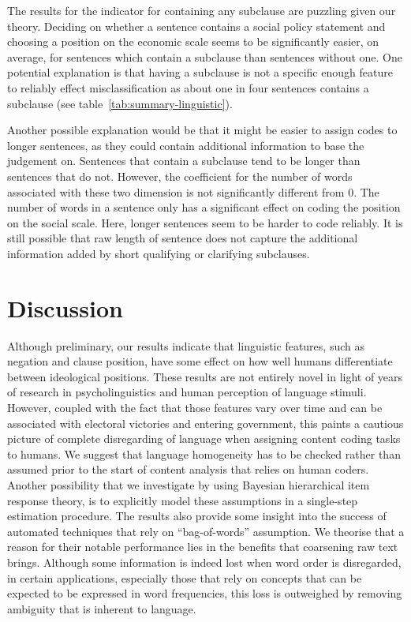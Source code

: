 \documentclass[a4paper, 12pt]{article}
\begin{document}
The results for the indicator for containing any subclause are puzzling given our theory. Deciding on whether a sentence contains a social policy statement and choosing a position on the economic scale seems to be significantly easier, on average, for sentences which contain a subclause than sentences without one. One potential explanation is that having a subclause is not a specific enough feature to reliably effect misclassification as about one in four sentences contains a subclause (see table~\ref{tab:summary-linguistic}).

Another possible explanation would be that it might be easier to assign codes to longer sentences, as they could contain additional information to base the judgement on. Sentences that contain a subclause tend to be longer than sentences that do not. However, the coefficient for the number of words associated with these two dimension is not significantly different from 0. The number of words in a sentence only has a significant effect on coding the position on the social scale. Here, longer sentences seem to be harder to code reliably. It is still possible that raw length of sentence does not capture the additional information added by short qualifying or clarifying subclauses.

\section{Discussion}
Although preliminary, our results indicate that linguistic features, such as negation and clause position, have some effect on how well humans differentiate between ideological positions. These results are not entirely novel in light of years of research in psycholinguistics and human perception of language stimuli. However, coupled with the fact that those features vary over time and can be associated with electoral victories and entering government, this paints a cautious picture of complete disregarding of language when assigning content coding tasks to humans. We suggest that language homogeneity has to be checked rather than assumed prior to the start of content analysis that relies on human coders. Another possibility that we investigate by using Bayesian hierarchical item response theory, is to explicitly model these assumptions in a single-step estimation procedure. The results also provide some insight into the success of automated techniques that rely on \enquote{bag-of-words} assumption. We theorise that a reason for their notable performance lies in the benefits that coarsening raw text brings. Although some information is indeed lost when word order is disregarded, in certain applications, especially those that rely on concepts that can be expected to be expressed in word frequencies, this loss is outweighed by removing ambiguity that is inherent to language.

\newpage
\singlespacing


\end{document}
